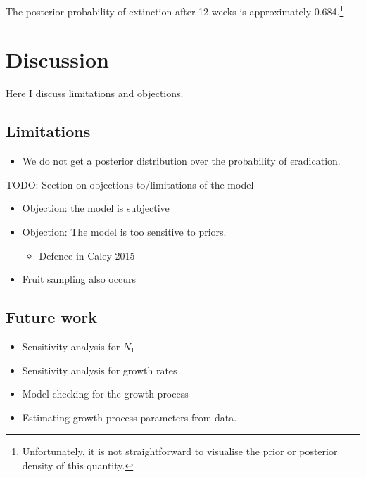 \documentclass[
  oneside]{book}
\providecommand{\tightlist}{%
  \setlength{\itemsep}{0pt}\setlength{\parskip}{0pt}}
\begin{document}
The posterior probability of extinction after 12 weeks is approximately 0.684.\footnote{Unfortunately, it is not straightforward to visualise the prior or posterior density of this quantity.}

\hypertarget{discussion}{%
\section{Discussion}\label{discussion}}

Here I discuss limitations and objections.

\hypertarget{limitations}{%
\subsection{Limitations}\label{limitations}}

\begin{itemize}
\tightlist
\item
  We do not get a posterior distribution over the probability of eradication.
\end{itemize}

TODO: Section on objections to/limitations of the model

\begin{itemize}
\tightlist
\item
  Objection: the model is subjective
\item
  Objection: The model is too sensitive to priors.

  \begin{itemize}
  \tightlist
  \item
    Defence in Caley 2015
  \end{itemize}
\item
  Fruit sampling also occurs
\end{itemize}

\hypertarget{future-work}{%
\subsection{Future work}\label{future-work}}

\begin{itemize}
\tightlist
\item
  Sensitivity analysis for \(N_1\)
\item
  Sensitivity analysis for growth rates
\item
  Model checking for the growth process
\item
  Estimating growth process parameters from data.
\end{itemize}
\end{document}
